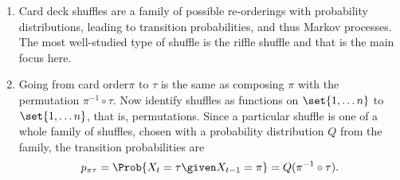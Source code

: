 \documentclass[12pt]{article}
\begin{document}
\begin{enumerate}
    \item
        Card deck shuffles are a family of possible re-orderings with
        probability distributions, leading to transition probabilities,
        and thus Markov processes.  The most well-studied type of
        shuffle is the riffle shuffle and that is the main focus here.
    \item
        Going from card order\( \pi \) to \( \tau \) is the same as
        composing \( \pi \) with the permutation \( \pi^{-1} \circ \tau \).
        Now identify shuffles as functions on \( \set{1, \dots n} \) to \(
        \set{1, \dots n} \), that is, permutations.%
        Since a particular shuffle is one of a whole family of shuffles,
        chosen with a probability distribution \( Q \) from the family,
        the transition probabilities are
        \[
          p_{\pi \tau} = \Prob{X_t = \tau \given X_{t-1} = \pi}
          = Q(\pi^{-1} \circ \tau).
        \]
        

\end{enumerate}
\end{document}
